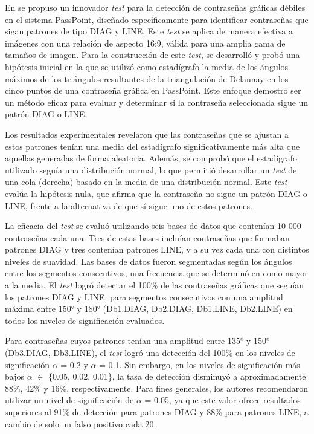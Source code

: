 \documentclass[12pt]{report}
\begin{document}

En \cite{13} se propuso un innovador \textit{test} para la detección de contraseñas gráficas débiles en el sistema PassPoint, diseñado específicamente para identificar contraseñas que sigan patrones de tipo DIAG y LINE. Este \textit{test} se aplica de manera efectiva a imágenes con una relación de aspecto 16:9, válida para una amplia gama de tamaños de imagen. Para la construcción de este \textit{test}, se desarrolló y probó una hipótesis inicial en la que se utilizó como estadígrafo la media de los ángulos máximos de los triángulos resultantes de la triangulación de Delaunay en los cinco puntos de una contraseña gráfica en PassPoint. Este enfoque demostró ser un método eficaz para evaluar y determinar si la contraseña seleccionada sigue un patrón DIAG o LINE.

Los resultados experimentales revelaron que las contraseñas que se ajustan a estos patrones tenían una media del estadígrafo significativamente más alta que aquellas generadas de forma aleatoria. Además, se comprobó que el estadígrafo utilizado seguía una distribución normal, lo que permitió desarrollar un \textit{test} de una cola (derecha) basado en la media de una distribución normal. Este \textit{test} evalúa la hipótesis nula, que afirma que la contraseña no sigue un patrón DIAG o LINE, frente a la alternativa de que sí sigue uno de estos patrones.

La eficacia del \textit{test} se evaluó utilizando seis bases de datos que contenían 10 000 contraseñas cada una. Tres de estas bases incluían contraseñas que formaban patrones DIAG y tres contenían patrones LINE, y a su vez cada una con distintos niveles de suavidad. Las bases de datos fueron segmentadas según los ángulos entre los segmentos consecutivos, una frecuencia que se determinó en \cite{5} como mayor a la media. El \textit{test} logró detectar el 100\% de las contraseñas gráficas que seguían los patrones DIAG y LINE, para segmentos consecutivos con una amplitud máxima entre 150° y 180° (Db1.DIAG, Db2.DIAG, Db1.LINE, Db2.LINE) en todos los niveles de significación evaluados.

Para contraseñas cuyos patrones tenían una amplitud entre 135° y 150° (Db3.DIAG, Db3.LINE), el \textit{test} logró una detección del 100\% en los niveles de significación $\alpha$ = 0.2 y $\alpha$ = 0.1. Sin embargo, en los niveles de significación más bajos  $\alpha$ $\in$ \{0.05, 0.02, 0.01\}, la tasa de detección disminuyó a aproximadamente 88\%, 42\% y 16\%, respectivamente. Para fines generales, los autores recomendaron utilizar un nivel de significación de $\alpha$ = 0.05, ya que este valor ofrece resultados superiores al 91\% de detección para patrones DIAG y 88\% para patrones LINE, a cambio de solo un falso positivo cada 20.
\end{document}

